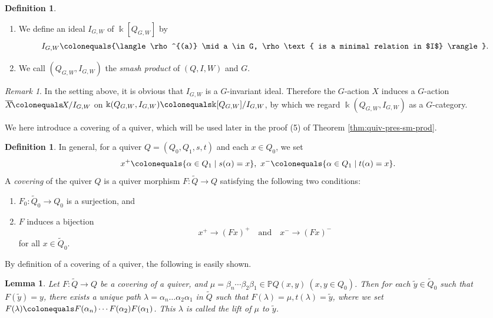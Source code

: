 \documentclass{surv-l}
\numberwithin{equation}{chapter}
\numberwithin{figure}{chapter}
\theoremstyle{plain}
\newtheorem{lem}[thm]{Lemma}
\theoremstyle{definition}
\newtheorem{dfn}[thm]{Definition}
\theoremstyle{remark}
\newtheorem{rmk}[thm]{Remark}
\begin{document}
\begin{dfn}
\begin{enumerate}
\item
We define an ideal $I_{G,W}$ of $\Bbbk[Q_{G,W}]$ by
\[
I_{G,W}\colonequals {\langle\rho^{(a)} \mid a \in G,
\rho \text{ is a minimal relation in $I$} \rangle}.
\]

\item
We call $(Q_{G,W}, I_{G,W})$ the \emph{smash product} of $(Q, I, W)$ and $G$.
\end{enumerate}
\end{dfn}

\begin{rmk}
\label{rmk:weight}
In the setting above, it is obvious that $I_{G, W}$ is a $G$-invariant ideal.
Therefore the $G$-action $X$ induces a $G$-action $\overline{X}\!\colonequals\!  X/I_{G,W}$
on $\Bbbk(Q_{G,W}, I_{G,W})\linebreak[3]\colonequals  \Bbbk[Q_{G,W}]/I_{G,W}$, by which
we regard $\Bbbk(Q_{G,W}, I_{G,W})$ as a $G$-category.
\end{rmk}

We here introduce a covering of a quiver, which will be used later
in the proof (5) of Theorem \ref{thm:quiv-pres-sm-prod}.

\begin{dfn}
\label{dfn:covering}
In general, for a quiver $Q = (Q_0, Q_1, s, t)$ and each $x \in Q_0$, we set
\[
x^+\colonequals  \{ \alpha \in Q_1 \mid s(\alpha) = x\},\
x^-\colonequals  \{ \alpha \in Q_1 \mid t(\alpha) = x\}.
\]
A \emph{covering} of the quiver $Q$ is a quiver morphism
$F \colon \tilde{Q} \to Q$ satisfying the following two conditions:
\begin{enumerate}
\item
$F_0 \colon \tilde{Q}_0 \to Q_0$ is a surjection, and
\item
$F$ induces a bijection
\begin{equation*}
x^+ \to (Fx)^+\quad\text{and}\quad x^- \to (Fx)^-
\end{equation*}
for all $x \in \tilde{Q}_0$.
\end{enumerate}
\end{dfn}

By definition of a covering of a quiver, the following is easily shown.

\begin{lem}\label{lem:unique-lift}
Let $F\colon \tilde{Q} \to Q$ be a covering of a quiver, and
$\mu = \beta_n\cdots \beta_2\beta_1 \in \mathbb{P} Q(x, y)\ (x, y \in Q_0)$.
Then for each $\tilde{y} \in \tilde{Q}_0$ such that $F(\tilde{y}) = y$,
there exists a unique path $\lambda = \alpha_n \dots\alpha_2\alpha_1$ in $\tilde{Q}$ such that
$F(\lambda) = \mu, t(\lambda) = \tilde{y}$, where
we set $F(\lambda)\colonequals  F(\alpha_n)\cdots F(\alpha_2)F(\alpha_1)$.
This $\lambda$ is called the \emph{lift}\index{lift} of $\mu$ to $\tilde{y}$.
\end{lem}
\end{document}
